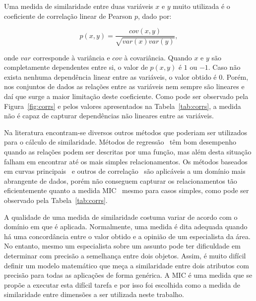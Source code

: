 Uma medida de similaridade entre duas variáveis $x$ e $y$
muito utilizada é o coeficiente de correlação linear de
Pearson $p$, dado por:

\begin{equation}
    p(x,y) =
    \frac{cov(x,y)}{\sqrt{var(x)var(y)}},
\end{equation}

\noindent onde $var$ corresponde à variância e $cov$ à
covariância. Quando $x$ e $y$ são completamente dependentes
entre si, o valor de $p(x,y)$ é $1$ ou $-1$. Caso não exista
nenhuma dependência linear entre as variáveis, o valor
obtido é $0$. Porém, nos conjuntos de dados as relações
entre as variáveis nem sempre são lineares e daí que surge a
maior limitação deste coeficiente.  Como pode ser observado
pela Figura~\ref{fig:corrs} e pelos valores apresentados na
Tabela~\ref{tab:corrs}, a medida não é capaz de capturar
dependências não lineares entre as variáveis. 






Na literatura encontram-se diversos outros métodos que
poderiam ser utilizados para o cálculo de similaridade.
Métodos de regressão~\cite{Friedman2001, Cleveland1988,
Stone1977} têm bom desempenho quando as relações podem ser
descritas por uma função, mas além desta situação falham em
encontrar até os mais simples relacionamentos. Os métodos
baseados em curvas principais~\cite{Hastie1989,
Tibshirani1992, Delicado2008} e outros de
correlação~\cite{Reny1959, Breiman1985, Kosorok2009} são
aplicáveis a um domínio mais abrangente de dados, porém não
conseguem capturar os relacionamentos tão eficientemente
quanto a medida MIC~\cite{Reshef2011} mesmo para casos
simples, como pode ser observado pela
Tabela~\ref{tab:corrs}.    

A qualidade de uma medida de similaridade costuma variar de
acordo com o domínio em que é aplicada. Normalmente, uma
medida é dita adequada quando há uma concordância entre o
valor obtido e a opinião de um especialista da área. No
entanto, mesmo um especialista sobre um assunto pode ter
dificuldade em determinar com precisão a semelhança entre
dois objetos. Assim, é muito difícil definir um modelo
matemático que meça a similaridade entre dois atributos com
precisão para todas as aplicações de forma genérica. A MIC é
uma medida que se propõe a executar esta difícil tarefa e
por isso foi escolhida como a medida de similaridade entre
dimensões a ser utilizada neste trabalho. 


